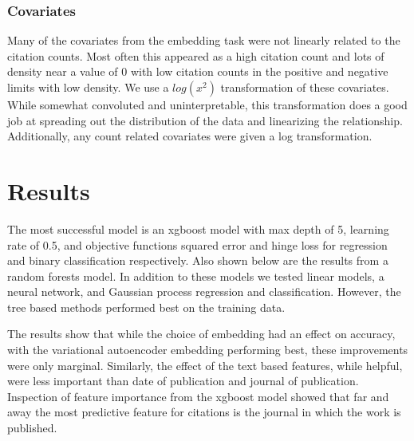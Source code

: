 \documentclass{article} %
\begin{document}
\subsubsection{Covariates}
Many of the covariates from the embedding task were not linearly related to the citation counts. Most often this appeared as a high citation count and lots of density near a value of 0 with low citation counts in the positive and negative limits with low density. We use a $log(x^2)$ transformation of these covariates. While somewhat convoluted and uninterpretable, this transformation does a good job at spreading out the distribution of the data and linearizing the relationship. Additionally, any count related covariates were given a log transformation.


\section{Results}
\label{others}

The most successful model is an xgboost model with max depth of 5, learning rate of 0.5, and objective functions squared error and hinge loss for regression and binary classification respectively. Also shown below are the results from a random forests model. In addition to these models we tested linear models, a neural network, and Gaussian process regression and classification. However, the tree based methods performed best on the training data.

The results show that while the choice of embedding had an effect on accuracy, with the variational autoencoder embedding performing best, these improvements were only marginal. Similarly, the effect of the text based features, while helpful,  were less important than date of publication and journal of publication. Inspection of feature importance from the xgboost model showed that far and away the most predictive feature for citations is the journal in which the work is published.
\end{document}
